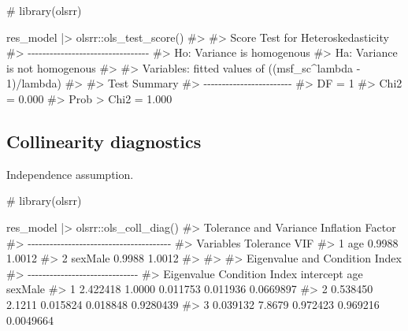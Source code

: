 \documentclass[
  12pt,
  a4paper,
  oneside]{tesesusp}
\newenvironment{Shaded}{\begin{snugshade}}{\end{snugshade}}
\newcommand{\CommentTok}[1]{\textcolor[rgb]{0.37,0.37,0.37}{#1}}
\newcommand{\FunctionTok}[1]{\textcolor[rgb]{0.28,0.35,0.67}{#1}}
\newcommand{\NormalTok}[1]{\textcolor[rgb]{0.00,0.23,0.31}{#1}}
\newcommand{\SpecialCharTok}[1]{\textcolor[rgb]{0.37,0.37,0.37}{#1}}
\begin{document}
\begin{Shaded}
\begin{Highlighting}[numbers=left,,]
\CommentTok{\# library(olsrr)}

\NormalTok{res\_model }\SpecialCharTok{|\textgreater{}}\NormalTok{ olsrr}\SpecialCharTok{::}\FunctionTok{ols\_test\_score}\NormalTok{()}
\CommentTok{\#\textgreater{} }
\CommentTok{\#\textgreater{}  Score Test for Heteroskedasticity}
\CommentTok{\#\textgreater{}  {-}{-}{-}{-}{-}{-}{-}{-}{-}{-}{-}{-}{-}{-}{-}{-}{-}{-}{-}{-}{-}{-}{-}{-}{-}{-}{-}{-}{-}{-}{-}{-}{-}}
\CommentTok{\#\textgreater{}  Ho: Variance is homogenous}
\CommentTok{\#\textgreater{}  Ha: Variance is not homogenous}
\CommentTok{\#\textgreater{} }
\CommentTok{\#\textgreater{}  Variables: fitted values of ((msf\_sc\^{}lambda {-} 1)/lambda) }
\CommentTok{\#\textgreater{} }
\CommentTok{\#\textgreater{}       Test Summary       }
\CommentTok{\#\textgreater{}  {-}{-}{-}{-}{-}{-}{-}{-}{-}{-}{-}{-}{-}{-}{-}{-}{-}{-}{-}{-}{-}{-}{-}{-}}
\CommentTok{\#\textgreater{}  DF            =    1 }
\CommentTok{\#\textgreater{}  Chi2          =    0.000 }
\CommentTok{\#\textgreater{}  Prob \textgreater{} Chi2   =    1.000}
\end{Highlighting}
\end{Shaded}

\hypertarget{collinearity-diagnostics}{%
\subsection{Collinearity diagnostics}\label{collinearity-diagnostics}}

Independence assumption.

\begin{Shaded}
\begin{Highlighting}[numbers=left,,]
\CommentTok{\# library(olsrr)}

\NormalTok{res\_model }\SpecialCharTok{|\textgreater{}}\NormalTok{ olsrr}\SpecialCharTok{::}\FunctionTok{ols\_coll\_diag}\NormalTok{()}
\CommentTok{\#\textgreater{} Tolerance and Variance Inflation Factor}
\CommentTok{\#\textgreater{} {-}{-}{-}{-}{-}{-}{-}{-}{-}{-}{-}{-}{-}{-}{-}{-}{-}{-}{-}{-}{-}{-}{-}{-}{-}{-}{-}{-}{-}{-}{-}{-}{-}{-}{-}{-}{-}{-}{-}}
\CommentTok{\#\textgreater{}   Variables Tolerance    VIF}
\CommentTok{\#\textgreater{} 1       age    0.9988 1.0012}
\CommentTok{\#\textgreater{} 2   sexMale    0.9988 1.0012}
\CommentTok{\#\textgreater{} }
\CommentTok{\#\textgreater{} }
\CommentTok{\#\textgreater{} Eigenvalue and Condition Index}
\CommentTok{\#\textgreater{} {-}{-}{-}{-}{-}{-}{-}{-}{-}{-}{-}{-}{-}{-}{-}{-}{-}{-}{-}{-}{-}{-}{-}{-}{-}{-}{-}{-}{-}{-}}
\CommentTok{\#\textgreater{}   Eigenvalue Condition Index intercept      age   sexMale}
\CommentTok{\#\textgreater{} 1   2.422418          1.0000  0.011753 0.011936 0.0669897}
\CommentTok{\#\textgreater{} 2   0.538450          2.1211  0.015824 0.018848 0.9280439}
\CommentTok{\#\textgreater{} 3   0.039132          7.8679  0.972423 0.969216 0.0049664}
\end{Highlighting}
\end{Shaded}
\end{document}
